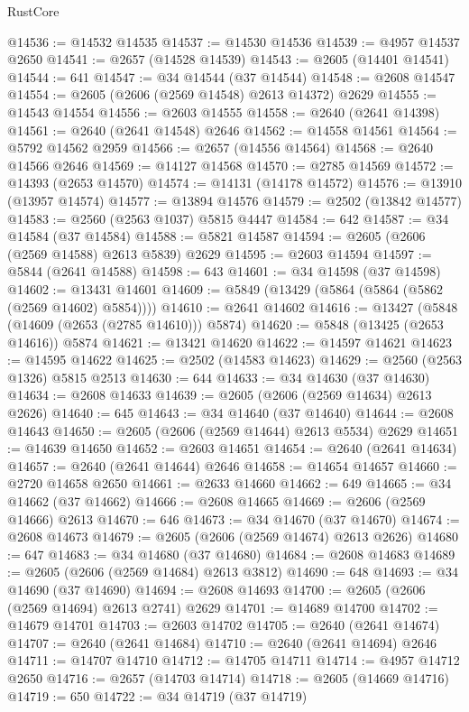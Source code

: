 \begin{lexlean}{RustCore}
\begin{coremodule}
@14536 := @14532 @14535
@14537 := @14530 @14536
@14539 := @4957 @14537 @2650
@14541 := @2657 (@14528 @14539)
@14543 := @2605 (@14401 @14541)
@14544 := 641
@14547 := @34 @14544 (@37 @14544)
@14548 := @2608 @14547
@14554 := @2605 (@2606 (@2569 @14548) @2613 @14372) @2629
@14555 := @14543 @14554
@14556 := @2603 @14555
@14558 := @2640 (@2641 @14398)
@14561 := @2640 (@2641 @14548) @2646
@14562 := @14558 @14561
@14564 := @5792 @14562 @2959
@14566 := @2657 (@14556 @14564)
@14568 := @2640 @14566 @2646
@14569 := @14127 @14568
@14570 := @2785 @14569
@14572 := @14393 (@2653 @14570)
@14574 := @14131 (@14178 @14572)
@14576 := @13910 (@13957 @14574)
@14577 := @13894 @14576
@14579 := @2502 (@13842 @14577)
@14583 := @2560 (@2563 @1037) @5815 @4447
@14584 := 642
@14587 := @34 @14584 (@37 @14584)
@14588 := @5821 @14587
@14594 := @2605 (@2606 (@2569 @14588) @2613 @5839) @2629
@14595 := @2603 @14594
@14597 := @5844 (@2641 @14588)
@14598 := 643
@14601 := @34 @14598 (@37 @14598)
@14602 := @13431 @14601
@14609 := @5849 (@13429 (@5864 (@5864 (@5862 (@2569 @14602) @5854))))
@14610 := @2641 @14602
@14616 := @13427 (@5848 (@14609 (@2653 (@2785 @14610))) @5874)
@14620 := @5848 (@13425 (@2653 @14616)) @5874
@14621 := @13421 @14620
@14622 := @14597 @14621
@14623 := @14595 @14622
@14625 := @2502 (@14583 @14623)
@14629 := @2560 (@2563 @1326) @5815 @2513
@14630 := 644
@14633 := @34 @14630 (@37 @14630)
@14634 := @2608 @14633
@14639 := @2605 (@2606 (@2569 @14634) @2613 @2626)
@14640 := 645
@14643 := @34 @14640 (@37 @14640)
@14644 := @2608 @14643
@14650 := @2605 (@2606 (@2569 @14644) @2613 @5534) @2629
@14651 := @14639 @14650
@14652 := @2603 @14651
@14654 := @2640 (@2641 @14634)
@14657 := @2640 (@2641 @14644) @2646
@14658 := @14654 @14657
@14660 := @2720 @14658 @2650
@14661 := @2633 @14660
@14662 := 649
@14665 := @34 @14662 (@37 @14662)
@14666 := @2608 @14665
@14669 := @2606 (@2569 @14666) @2613
@14670 := 646
@14673 := @34 @14670 (@37 @14670)
@14674 := @2608 @14673
@14679 := @2605 (@2606 (@2569 @14674) @2613 @2626)
@14680 := 647
@14683 := @34 @14680 (@37 @14680)
@14684 := @2608 @14683
@14689 := @2605 (@2606 (@2569 @14684) @2613 @3812)
@14690 := 648
@14693 := @34 @14690 (@37 @14690)
@14694 := @2608 @14693
@14700 := @2605 (@2606 (@2569 @14694) @2613 @2741) @2629
@14701 := @14689 @14700
@14702 := @14679 @14701
@14703 := @2603 @14702
@14705 := @2640 (@2641 @14674)
@14707 := @2640 (@2641 @14684)
@14710 := @2640 (@2641 @14694) @2646
@14711 := @14707 @14710
@14712 := @14705 @14711
@14714 := @4957 @14712 @2650
@14716 := @2657 (@14703 @14714)
@14718 := @2605 (@14669 @14716)
@14719 := 650
@14722 := @34 @14719 (@37 @14719)

\end{coremodule}
\end{lexlean}

